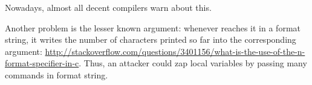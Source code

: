 Nowadays, almost all decent compilers warn about this.

Another problem is the lesser known  \printf argument: whenever \printf reaches it in a format string, it writes
the number of characters printed so far into the corresponding argument:
\url{http://stackoverflow.com/questions/3401156/what-is-the-use-of-the-n-format-specifier-in-c}.
Thus, an attacker could zap local variables by passing many  commands in format string.


